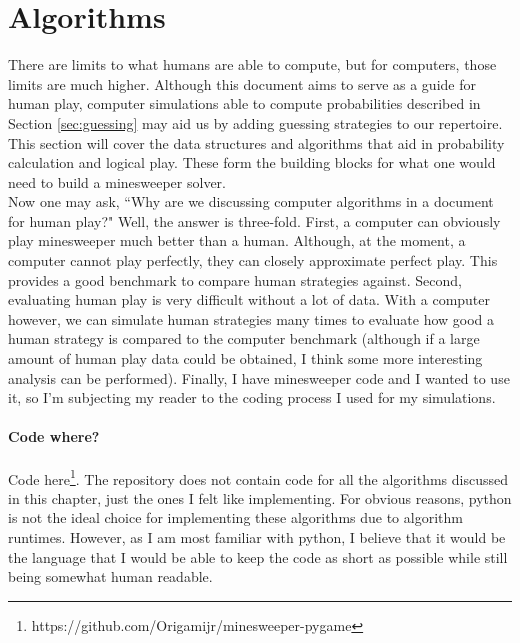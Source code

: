 \chapter{Algorithms}\label{sec:algorithms}

There are limits to what humans are able to compute, but for computers, those limits are much higher. Although this document aims to serve as a guide for human play, computer simulations able to compute probabilities described in Section \ref{sec:guessing} may aid us by adding guessing strategies to our repertoire. This section will cover the data structures and algorithms that aid in probability calculation and logical play. These form the building blocks for what one would need to build a minesweeper solver.\\

Now one may ask, ``Why are we discussing computer algorithms in a document for human play?" Well, the answer is three-fold. First, a computer can obviously play minesweeper much better than a human. Although, at the moment, a computer cannot play perfectly, they can closely approximate perfect play. This provides a good benchmark to compare human strategies against. Second, evaluating human play is very difficult without a lot of data. With a computer however, we can simulate human strategies many times to evaluate how good a human strategy is compared to the computer benchmark (although if a large amount of human play data could be obtained, I think some more interesting analysis can be performed). Finally, I have minesweeper code and I wanted to use it, so I'm subjecting my reader to the coding process I used for my simulations.\\

\subsubsection*{Code where?}
Code here\footnote{https://github.com/Origamijr/minesweeper-pygame}. The repository does not contain code for all the algorithms discussed in this chapter, just the ones I felt like implementing. For obvious reasons, python is not the ideal choice for implementing these algorithms due to algorithm runtimes. However, as I am most familiar with python, I believe that it would be the language that I would be able to keep the code as short as possible while still being somewhat human readable.\\







